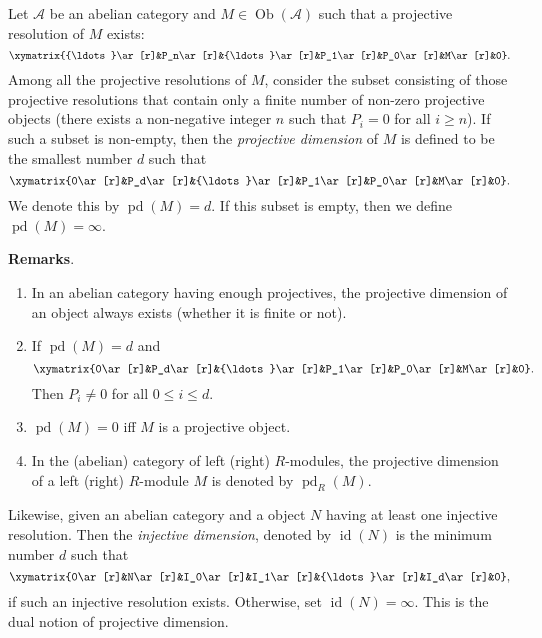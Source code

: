 \documentclass[12pt]{article}
\begin{document}
Let $\mathcal{A}$ be an abelian category and $M\in\operatorname{Ob}(\mathcal{A})$ such that a projective resolution of $M$ exists:
$$\xymatrix{{\ldots}\ar[r]&P_n\ar[r]&{\ldots}\ar[r]&P_1\ar[r]&P_0\ar[r]&M\ar[r]&0}.$$
Among all the projective resolutions of $M$, consider the subset consisting of those projective resolutions that contain only a finite number of non-zero projective objects (there exists a non-negative integer $n$ such that $P_i=0$ for all $i\geq n$).  If such a subset is non-empty, then the \emph{projective dimension} of $M$ is defined to be the smallest number $d$ such that 
$$\xymatrix{0\ar[r]&P_d\ar[r]&{\ldots}\ar[r]&P_1\ar[r]&P_0\ar[r]&M\ar[r]&0}.$$
We denote this by $\operatorname{pd}(M)=d$.  If this subset is empty, then we define $\operatorname{pd}(M)=\infty$.

\textbf{Remarks}.
\begin{enumerate}
\item In an abelian category having enough projectives, the projective dimension of an object always exists (whether it is finite or not).
\item If $\operatorname{pd}(M)=d$ and 
$$\xymatrix{0\ar[r]&P_d\ar[r]&{\ldots}\ar[r]&P_1\ar[r]&P_0\ar[r]&M\ar[r]&0}.$$
Then $P_i\neq0$ for all $0\leq i\leq d$.
\item $\operatorname{pd}(M)=0$ iff $M$ is a projective object.
\item In the (abelian) category of left (right) $R$-modules, the projective dimension of a left (right) $R$-module $M$ is denoted by $\operatorname{pd}_R(M)$.
\end{enumerate}

Likewise, given an abelian category and a object $N$ having at least one injective resolution.  Then the \emph{injective dimension}, denoted by $\operatorname{id}(N)$ is the minimum number $d$ such that 
$$\xymatrix{0\ar[r]&N\ar[r]&I_0\ar[r]&I_1\ar[r]&{\ldots}\ar[r]&I_d\ar[r]&0},$$
if such an injective resolution exists.  Otherwise, set $\operatorname{id}(N)=\infty$.  This is the dual notion of projective dimension.
\end{document}
